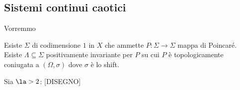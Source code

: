 \subsection{Sistemi continui caotici}
Vorremmo
\begin{theorem}
Esiste $\Sigma$ di codimensione $1$ in $X$ che ammette $P:\Sigma\to\Sigma$ mappa di Poincar\'e.\\
Esiste $\Lambda\subseteq \Sigma$ positivamente invariante per $P$ su cui $P$ \`e topologicamente coniugata a $(\Omega,\sigma)$ dove $\sigma$ \`e lo shift.
\end{theorem}

\begin{definition}
Sia $\la>2$:
[DISEGNO]
\end{definition}
